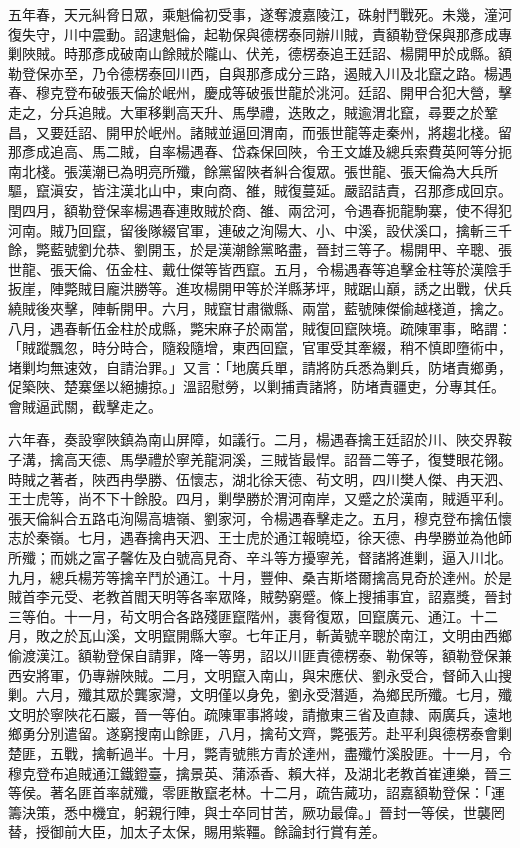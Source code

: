 \begin{pinyinscope}
五年春，天元糾脅日眾，乘魁倫初受事，遂奪渡嘉陵江，硃射鬥戰死。未幾，潼河復失守，川中震動。詔逮魁倫，起勒保與德楞泰同辦川賊，責額勒登保與那彥成專剿陜賊。時那彥成破南山餘賊於隴山、伏羌，德楞泰追王廷詔、楊開甲於成縣。額勒登保亦至，乃令德楞泰回川西，自與那彥成分三路，遏賊入川及北竄之路。楊遇春、穆克登布破張天倫於岷州，慶成等破張世龍於洮河。廷詔、開甲合犯大營，擊走之，分兵追賊。大軍移剿高天升、馬學禮，迭敗之，賊逾渭北竄，尋要之於鞏昌，又要廷詔、開甲於岷州。諸賊並逼回渭南，而張世龍等走秦州，將趨北棧。留那彥成追高、馬二賊，自率楊遇春、岱森保回陜，令王文雄及總兵索費英阿等分扼南北棧。張漢潮已為明亮所殲，餘黨留陜者糾合復眾。張世龍、張天倫為大兵所驅，竄滇安，皆注漢北山中，東向商、雒，賊復蔓延。嚴詔詰責，召那彥成回京。閏四月，額勒登保率楊遇春連敗賊於商、雒、兩岔河，令遇春扼龍駒寨，使不得犯河南。賊乃回竄，留後隊綴官軍，連破之洵陽大、小、中溪，設伏溪口，擒斬三千餘，斃藍號劉允恭、劉開玉，於是漢潮餘黨略盡，晉封三等子。楊開甲、辛聰、張世龍、張天倫、伍金柱、戴仕傑等皆西竄。五月，令楊遇春等追擊金柱等於漢陰手扳崖，陣斃賊目龐洪勝等。進攻楊開甲等於洋縣茅坪，賊踞山巔，誘之出戰，伏兵繞賊後夾擊，陣斬開甲。六月，賊竄甘肅徽縣、兩當，藍號陳傑偷越棧道，擒之。八月，遇春斬伍金柱於成縣，斃宋麻子於兩當，賊復回竄陜境。疏陳軍事，略謂：「賊蹤飄忽，時分時合，隨殺隨增，東西回竄，官軍受其牽綴，稍不慎即墮術中，堵剿均無速效，自請治罪。」又言：「地廣兵單，請將防兵悉為剿兵，防堵責鄉勇，促築陜、楚寨堡以絕擄掠。」溫詔慰勞，以剿捕責諸將，防堵責疆吏，分專其任。會賊逼武關，截擊走之。

六年春，奏設寧陜鎮為南山屏障，如議行。二月，楊遇春擒王廷詔於川、陜交界鞍子溝，擒高天德、馬學禮於寧羌龍洞溪，三賊皆最悍。詔晉二等子，復雙眼花翎。時賊之著者，陜西冉學勝、伍懷志，湖北徐天德、茍文明，四川樊人傑、冉天泗、王士虎等，尚不下十餘股。四月，剿學勝於渭河南岸，又蹙之於漢南，賊遁平利。張天倫糾合五路屯洵陽高塘嶺、劉家河，令楊遇春擊走之。五月，穆克登布擒伍懷志於秦嶺。七月，遇春擒冉天泗、王士虎於通江報曉埡，徐天德、冉學勝並為他師所殲；而姚之富子馨佐及白號高見奇、辛斗等方擾寧羌，督諸將進剿，逼入川北。九月，總兵楊芳等擒辛鬥於通江。十月，豐伸、桑吉斯塔爾擒高見奇於達州。於是賊首李元受、老教首閻天明等各率眾降，賊勢窮蹙。條上搜捕事宜，詔嘉獎，晉封三等伯。十一月，茍文明合各路殘匪竄階州，裹脅復眾，回竄廣元、通江。十二月，敗之於瓦山溪，文明竄開縣大寧。七年正月，斬黃號辛聰於南江，文明由西鄉偷渡漢江。額勒登保自請罪，降一等男，詔以川匪責德楞泰、勒保等，額勒登保兼西安將軍，仍專辦陜賊。二月，文明竄入南山，與宋應伏、劉永受合，督師入山搜剿。六月，殲其眾於龔家灣，文明僅以身免，劉永受潛遁，為鄉民所殲。七月，殲文明於寧陜花石巖，晉一等伯。疏陳軍事將竣，請撤東三省及直隸、兩廣兵，遠地鄉勇分別遣留。遂窮搜南山餘匪，八月，擒茍文齊，斃張芳。赴平利與德楞泰會剿楚匪，五戰，擒斬過半。十月，斃青號熊方青於達州，盡殲竹溪股匪。十一月，令穆克登布追賊通江鐵鐙臺，擒景英、蒲添香、賴大祥，及湖北老教首崔連樂，晉三等侯。著名匪首率就殲，零匪散竄老林。十二月，疏告蕆功，詔嘉額勒登保：「運籌決策，悉中機宜，躬親行陣，與士卒同甘苦，厥功最偉。」晉封一等侯，世襲罔替，授御前大臣，加太子太保，賜用紫韁。餘論封行賞有差。


\end{pinyinscope}
